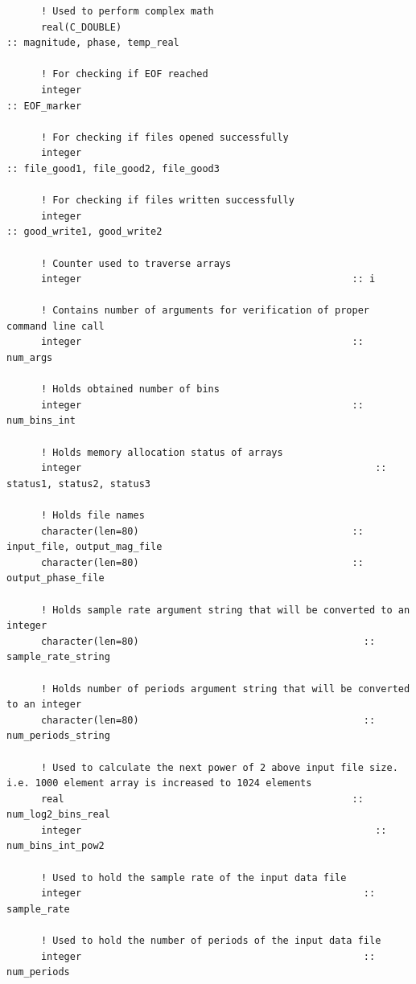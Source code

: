 \begin{verbatim}
      ! Used to perform complex math
      real(C_DOUBLE)                                                                      :: magnitude, phase, temp_real
      
      ! For checking if EOF reached
      integer                                                                             :: EOF_marker
      
      ! For checking if files opened successfully
      integer                                     			                :: file_good1, file_good2, file_good3
      
      ! For checking if files written successfully
      integer                                                                             :: good_write1, good_write2			
      
      ! Counter used to traverse arrays
      integer                     							:: i
      
      ! Contains number of arguments for verification of proper command line call
      integer                     							:: num_args
      
      ! Holds obtained number of bins
      integer                     							:: num_bins_int
      
      ! Holds memory allocation status of arrays
      integer						                           	:: status1, status2, status3
      
      ! Holds file names
      character(len=80)               						:: input_file, output_mag_file
      character(len=80)				                   		:: output_phase_file
      
      ! Holds sample rate argument string that will be converted to an integer
      character(len=80)                                       :: sample_rate_string
      
      ! Holds number of periods argument string that will be converted to an integer
      character(len=80)                                       :: num_periods_string
      
      ! Used to calculate the next power of 2 above input file size.  i.e. 1000 element array is increased to 1024 elements
      real			                         				:: num_log2_bins_real
      integer							                        :: num_bins_int_pow2
      
      ! Used to hold the sample rate of the input data file
      integer                                                 :: sample_rate
      
      ! Used to hold the number of periods of the input data file
      integer                                                 :: num_periods
      

\end{verbatim}
